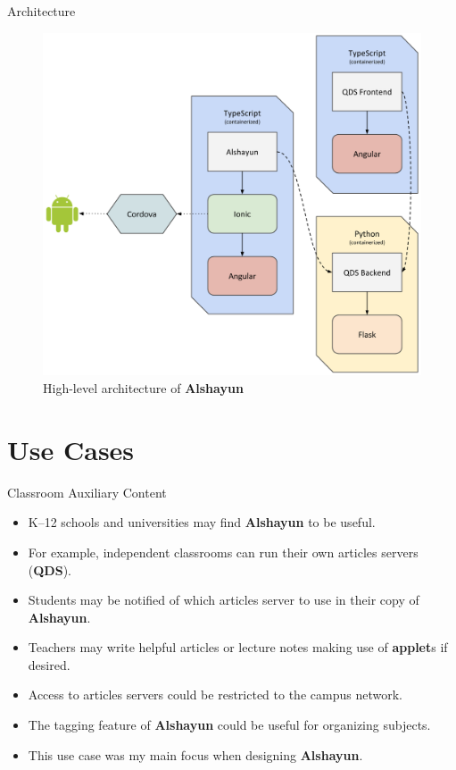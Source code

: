 \documentclass{beamer}
\begin{document}
\begin{frame}{Architecture}
    \begin{figure}
        \begin{center}
            \includegraphics[scale=0.2]{images/arch.png}
        \end{center}
        \caption{High-level architecture of \textbf{Alshayun}}
    \end{figure}
\end{frame}

\section{Use Cases}

\begin{frame}{Classroom Auxiliary Content}
    \begin{itemize}
        \item K--12 schools and universities may find \textbf{Alshayun} to be
            useful.
        \item For example, independent classrooms can run their own articles
            servers (\textbf{QDS}).
        \item Students may be notified of which articles server to use in their
            copy of \textbf{Alshayun}.
        \item Teachers may write helpful articles or lecture notes making use of
            \textbf{applet}s if desired.
        \item Access to articles servers could be restricted to the campus
            network.
        \item The tagging feature of \textbf{Alshayun} could be useful for
            organizing subjects.
        \item This use case was my main focus when designing \textbf{Alshayun}.
    \end{itemize}
\end{frame}
\end{document}
